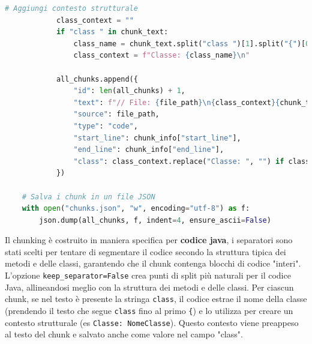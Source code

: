 \documentclass[12pt,a4paper,openright,twoside]{book}
\begin{document}
\begin{lstlisting}[language=Python, caption={Codice Python per la suddivisione dei file Java in chunk}, label={lst:chunking}, inputencoding=utf8]
            # Aggiungi contesto strutturale
            class_context = ""
            if "class " in chunk_text:
                class_name = chunk_text.split("class ")[1].split("{")[0].strip()
                class_context = f"Classe: {class_name}\n"
            
            all_chunks.append({
                "id": len(all_chunks) + 1,
                "text": f"// File: {file_path}\n{class_context}{chunk_text}",
                "source": file_path,
                "type": "code",
                "start_line": chunk_info["start_line"],
                "end_line": chunk_info["end_line"],
                "class": class_context.replace("Classe: ", "") if class_context else ""
            })
    
    # Salva i chunk in un file JSON
    with open("chunks.json", "w", encoding="utf-8") as f:
        json.dump(all_chunks, f, indent=4, ensure_ascii=False)
\end{lstlisting}
Il chunking è costruito in maniera specifica per \textbf{codice java}, i separatori sono stati scelti per tentare di segmentare il codice secondo la struttura tipica dei metodi e delle classi, garantendo che il chunk contenga blocchi di codice "interi".
L'opzione \texttt{keep\_separator=False} crea punti di split più naturali per il codice Java, allineandosi meglio con la struttura dei metodi e delle classi.
Per ciascun chunk, se nel testo è presente la stringa \texttt{class}, il codice estrae il nome della classe 
(prendendo il testo che segue \texttt{class} fino al primo \texttt{\{}) e lo utilizza per creare un contesto 
strutturale (es \texttt{Classe: NomeClasse}).
Questo contesto viene preappeso al testo del chunk e salvato anche come valore nel campo "class".
\end{document}
